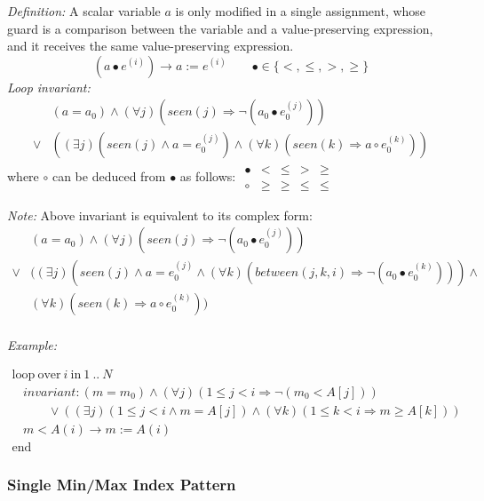 \documentclass[a4paper,10pt]{article}
\newcommand{\idx}{\ensuremath{i}\xspace}
\newcommand{\at}[1]{{(#1)}}
\newcommand{\KWloop}{\ensuremath{\mathrm{loop}~}}
\newcommand{\KWend}{\ensuremath{\mathrm{end}~}}
\newcommand{\KWover}{\ensuremath{\mathrm{over}~}}
\newcommand{\KWin}{\ensuremath{~\mathrm{in}~}}
\newcommand{\impl}{\ensuremath{\Longrightarrow}}
\newcommand{\seen}[1]{\ensuremath{\mathit{seen}(#1)}\xspace}
\newcommand{\between}[3]{\ensuremath{\mathit{between}{(#1,#2,#3)}}\xspace}
\newcommand{\loopinvariant}{\noindent\textit{Loop invariant:}\xspace}
\newcommand{\patterndef}{\noindent\textit{Definition:}\xspace}
\newcommand{\patternexample}{\noindent\textit{Example:}\xspace}
\newcommand{\patternnote}{\noindent\textit{Note:}\xspace}
\begin{document}
\patterndef A scalar variable $a$ is only modified in a single assignment, whose
guard is a comparison between the variable and a value-preserving expression, and
it receives the same value-preserving expression.
%
$$(a \bullet e^\at{\idx}) \rightarrow a := e^\at{\idx}  \qquad \bullet \in \{<, \leq, >, \geq \}$$
%
\loopinvariant
%
\begin{eqnarray*}
&(a = a_0) \land (\forall j)(\seen{j} \impl \neg (a_0 \bullet e_0^\at{j}))\\
\lor 
& ((\exists j)(\seen{j} \land a = e_0^\at{j}) \land (\forall k)(\seen{k} \impl a \circ e_0^\at{k}))
\end{eqnarray*}
where $\circ$ can be deduced from $\bullet$ as follows:
$\begin{array}{l|llll}
\bullet & <    & \leq & >    & \geq \\ \hline
\circ   & \geq & \geq & \leq & \leq
\end{array}$

\bigskip
\patternnote Above invariant is equivalent to its complex form:
\begin{eqnarray*}
&(a = a_0) \land (\forall j)(\seen{j} \impl \neg (a_0 \bullet e_0^\at{j}))\\
\lor 
& ((\exists j)(\seen{j} \land a = e_0^\at{j} \land (\forall k)(\between{j}{k}{i} \impl \neg (a_0 \bullet e_0^\at{k}))) \land \\
&(\forall k)(\seen{k} \impl a \circ e_0^\at{k}))\\
\end{eqnarray*}

\bigskip
\patternexample

\medskip
$\begin{array}{l}
  \KWloop \KWover i \KWin 1~..~N \\
  ~~~~ \textit{invariant}: (m = m_0) \land (\forall j)(1\leq j < i \impl \neg (m_0 < A[j]))\\
  ~~~~~~~~~~~~~ \lor ((\exists j)(1\leq j < i \land m = A[j]) \land (\forall k)(1\leq k < i \impl m \geq A[k]))\\
  ~~~~ m < A(i) \rightarrow m := A(i)\\
  \KWend
\end{array}$

\subsubsection*{Single Min/Max Index Pattern}
\end{document}
